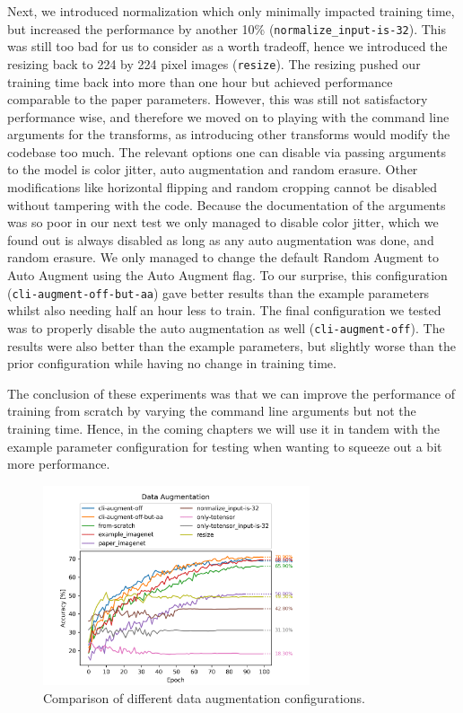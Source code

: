 \documentclass{article}
\begin{document}
Next, we introduced normalization which only minimally impacted training time, but increased the performance by another 10\% (\texttt{normalize\_input-is-32}).
This was still too bad for us to consider as a worth tradeoff, hence we introduced the resizing back to 224 by 224 pixel images (\texttt{resize}).
The resizing pushed our training time back into more than one hour but achieved performance comparable to the paper parameters.
However, this was still not satisfactory performance wise, and therefore we moved on to playing with the command line arguments for the transforms, as introducing other transforms would modify the codebase too much.
The relevant options one can disable via passing arguments to the model is color jitter, auto augmentation and random erasure.
Other modifications like horizontal flipping and random cropping cannot be disabled without tampering with the code.
Because the documentation of the arguments was so poor in our next test we only managed to disable color jitter, which we found out is always disabled as long as any auto augmentation was done, and random erasure.
We only managed to change the default Random Augment to Auto Augment using the Auto Augment flag.
To our surprise, this configuration (\texttt{cli-augment-off-but-aa}) gave better results than the example parameters whilst also needing half an hour less to train.
The final configuration we tested was to properly disable the auto augmentation as well (\texttt{cli-augment-off}).
The results were also better than the example parameters, but slightly worse than the prior configuration while having no change in training time.

The conclusion of these experiments was that we can improve the performance of training from scratch by varying the command line arguments but not the training time.
Hence, in the coming chapters we will use it in tandem with the example parameter configuration for testing when wanting to squeeze out a bit more performance.
\begin{figure}[h]
    \centering
    \includegraphics[width=0.7\textwidth]{images/data_augmentation}
    \caption{Comparison of different data augmentation configurations.}
    \label{fig:data-augmentation}
\end{figure}
\end{document}
